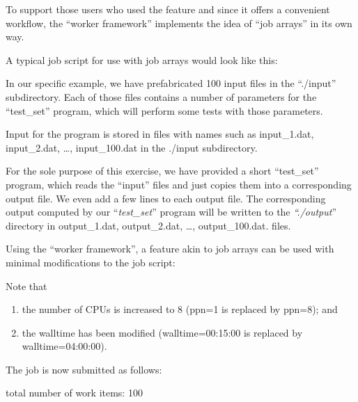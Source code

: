 To support those users who used the feature and since it offers a convenient
workflow, the ``worker framework'' implements the idea of ``job arrays'' in its
own way.

A typical job script for use with job arrays would look like this:


In our specific example, we have prefabricated 100 input files in the
``./input'' subdirectory. Each of those files contains a number of parameters
for the ``test\_set'' program, which will perform some tests with those
parameters.

Input for the program is stored in files with names such as input\_1.dat,
input\_2.dat, \ldots, input\_100.dat in the ./input subdirectory.


For the sole purpose of this exercise, we have provided a short ``test\_set''
program, which reads the ``input'' files and just copies them into a
corresponding output file.  We even add a few lines to each output file. The
corresponding output computed by our ``\textit{test\_set}'' program will be
written to the \textit{``./output}'' directory in output\_1.dat, output\_2.dat,
\ldots, output\_100.dat. files.


Using the ``worker framework'', a feature akin to job arrays can be used with
minimal modifications to the job script:


Note that

\begin{enumerate}
\item  the number of CPUs is increased to 8 (ppn=1 is replaced by ppn=8); and
\item  the walltime has been modified (walltime=00:15:00 is replaced by walltime=04:00:00).
\end{enumerate}

The job is now submitted as follows:

\begin{prompt}
total number of work items: 100
\end{prompt}

